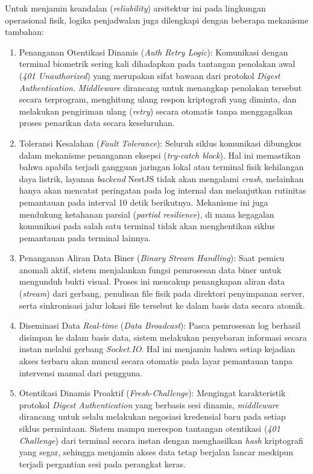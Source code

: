 Untuk menjamin keandalan (\textit{reliability}) arsitektur ini pada lingkungan operasional fisik, logika penjadwalan juga dilengkapi dengan beberapa mekanisme tambahan:
\begin{enumerate}
    \item Penanganan Otentikasi Dinamis (\textit{Auth Retry Logic}): Komunikasi dengan terminal biometrik sering kali dihadapkan pada tantangan penolakan awal (\textit{401 Unauthorized}) yang merupakan sifat bawaan dari protokol \textit{Digest Authentication}. \textit{Middleware} dirancang untuk menangkap penolakan tersebut secara terprogram, menghitung ulang respon kriptografi yang diminta, dan melakukan pengiriman ulang (\textit{retry}) secara otomatis tanpa menggagalkan proses penarikan data secara keseluruhan.
    \item Toleransi Kesalahan (\textit{Fault Tolerance}): Seluruh siklus komunikasi dibungkus dalam mekanisme penanganan eksepsi (\textit{try-catch block}). Hal ini memastikan bahwa apabila terjadi gangguan jaringan lokal atau terminal fisik kehilangan daya listrik, layanan \textit{backend} NestJS tidak akan mengalami \textit{crash}, melainkan hanya akan mencatat peringatan pada log internal dan melanjutkan rutinitas pemantauan pada interval 10 detik berikutnya. Mekanisme ini juga mendukung ketahanan parsial (\textit{partial resilience}), di mana kegagalan komunikasi pada salah satu terminal tidak akan menghentikan siklus pemantauan pada terminal lainnya.
    \item Penanganan Aliran Data Biner (\textit{Binary Stream Handling}): Saat pemicu anomali aktif, sistem menjalankan fungsi pemrosesan data biner untuk mengunduh bukti visual. Proses ini mencakup penangkapan aliran data (\textit{stream}) dari gerbang, penulisan file fisik pada direktori penyimpanan server, serta sinkronisasi jalur lokasi file tersebut ke dalam basis data secara atomik.
    \item Diseminasi Data \textit{Real-time} (\textit{Data Broadcast}): Pasca pemrosesan log berhasil disimpan ke dalam basis data, sistem melakukan penyebaran informasi secara instan melalui gerbang \textit{Socket.IO}. Hal ini menjamin bahwa setiap kejadian akses terbaru akan muncul secara otomatis pada layar pemantauan tanpa intervensi manual dari pengguna.
    \item Otentikasi Dinamis Proaktif (\textit{Fresh-Challenge}): Mengingat karakteristik protokol \textit{Digest Authentication} yang berbasis sesi dinamis, \textit{middleware} dirancang untuk selalu melakukan negosiasi kredensial baru pada setiap siklus permintaan. Sistem mampu merespon tantangan otentikasi (\textit{401 Challenge}) dari terminal secara instan dengan menghasilkan \textit{hash} kriptografi yang segar, sehingga menjamin akses data tetap berjalan lancar meskipun terjadi pergantian sesi pada perangkat keras.

\end{enumerate}
